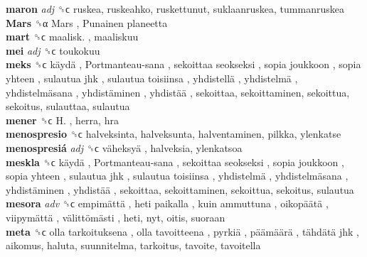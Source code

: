 \textbf{maron} \emph{adj}  ␝ϲ  ruskea, ruskeahko, ruskettunut, suklaanruskea, tummanruskea  \\
\textbf{Mars} ␝α   Mars ,  Punainen planeetta   \\
\textbf{mart} ␝ϲ   maalisk. , maaliskuu  \\
\textbf{mei} \emph{adj}  ␝ϲ  toukokuu  \\
\textbf{meks} ␝ϲ   käydä ,  Portmanteau-sana ,  sekoittaa seokseksi ,  sopia joukkoon ,  sopia yhteen ,  sulautua jhk ,  sulautua toisiinsa ,  yhdistellä ,  yhdistelmä ,  yhdistelmäsana ,  yhdistäminen ,  yhdistää , sekoittaa, sekoittaminen, sekoittua, sekoitus, sulauttaa, sulautua  \\
\textbf{mener} ␝ϲ   H. , herra, hra  \\
\textbf{menospresio} ␝ϲ  halveksinta, halveksunta, halventaminen, pilkka, ylenkatse  \\
\textbf{menospresiá} \emph{adj}  ␝ϲ   väheksyä , halveksia, ylenkatsoa  \\
\textbf{meskla} ␝ϲ   käydä ,  Portmanteau-sana ,  sekoittaa seokseksi ,  sopia joukkoon ,  sopia yhteen ,  sulautua jhk ,  sulautua toisiinsa ,  yhdistelmä ,  yhdistelmäsana ,  yhdistäminen ,  yhdistää , sekoittaa, sekoittaminen, sekoittua, sekoitus, sulautua  \\
\textbf{mesora} \emph{adv}  ␝ϲ   empimättä ,  heti paikalla ,  kuin ammuttuna ,  oikopäätä ,  viipymättä ,  välittömästi , heti, nyt, oitis, suoraan  \\
\textbf{meta} ␝ϲ   olla tarkoituksena ,  olla tavoitteena ,  pyrkiä ,  päämäärä ,  tähdätä jhk , aikomus, haluta, suunnitelma, tarkoitus, tavoite, tavoitella  \\
